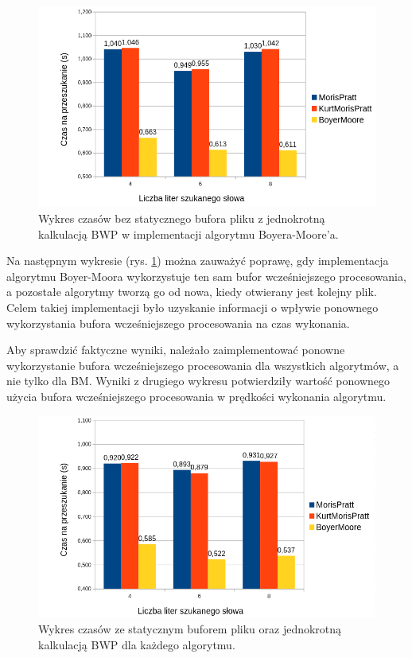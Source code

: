 \begin{figure}[htbp]
    \includegraphics[width=\textwidth]{./images/GraphPreAllocBM.png}
    \caption{Wykres czasów bez statycznego bufora pliku z jednokrotną kalkulacją
     BWP w implementacji algorytmu Boyera-Moore'a. }
    \label{fig:GraphPreAllocBM}
\end{figure}

Na następnym wykresie (rys. \ref{fig:GraphPreAllocBM}) można zauważyć poprawę, gdy
implementacja algorytmu Boyer-Moora wykorzystuje ten sam bufor wcześniejszego procesowania, a
pozostałe algorytmy tworzą go od nowa, kiedy otwierany jest kolejny plik. Celem 
takiej implementacji było uzyskanie informacji o wpływie ponownego wykorzystania
bufora wcześniejszego procesowania na czas wykonania. 

Aby sprawdzić faktyczne wyniki, należało zaimplementować ponowne wykorzystanie
bufora wcześniejszego procesowania dla wszystkich algorytmów, a nie tylko dla BM.
Wyniki z drugiego wykresu potwierdziły wartość ponownego użycia bufora
wcześniejszego procesowania w prędkości wykonania algorytmu.

\begin{figure}[htbp]
    \includegraphics[width=\textwidth]{./images/GraphStaticPreallocAndFileBuffer.png}
    \caption{Wykres czasów ze statycznym buforem pliku oraz jednokrotną kalkulacją BWP dla każdego algorytmu.}
    \label{fig:GraphStaticPreallocAndFileBuffer}
\end{figure}

